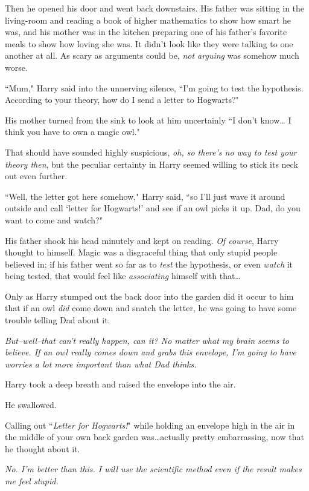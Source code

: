 Then he opened his door and went back downstairs. His father was sitting in the living-room and reading a book of higher mathematics to show how smart he was, and his mother was in the kitchen preparing one of his father's favorite meals to show how loving she was. It didn't look like they were talking to one another at all. As scary as arguments could be, \emph{not arguing} was somehow much worse.

``Mum," Harry said into the unnerving silence, ``I'm going to test the hypothesis. According to your theory, how do I send a letter to Hogwarts?"

His mother turned from the sink to look at him uncertainly ``I don't know{\ldots} I think you have to own a magic owl."

That should have sounded highly suspicious, \emph{oh, so there's no way to test your theory then}, but the peculiar certainty in Harry seemed willing to stick its neck out even further.

``Well, the letter got here somehow," Harry said, ``so I'll just wave it around outside and call `letter for Hogwarts!' and see if an owl picks it up. Dad, do you want to come and watch?"

His father shook his head minutely and kept on reading. \emph{Of course}, Harry thought to himself. Magic was a disgraceful thing that only stupid people believed in; if his father went so far as to \emph{test} the hypothesis, or even \emph{watch} it being tested, that would feel like \emph{associating} himself with that{\ldots}

Only as Harry stumped out the back door into the garden did it occur to him that if an owl \emph{did} come down and snatch the letter, he was going to have some trouble telling Dad about it.

\emph{But\---well\---that can't \emph{really} happen, can it? No matter what my brain seems to believe. If an owl really comes down and grabs this envelope, I'm going to have worries a lot more important than what Dad thinks.}

Harry took a deep breath and raised the envelope into the air.

He swallowed.

Calling out ``\emph{Letter for Hogwarts!}" while holding an envelope high in the air in the middle of your own back garden was{\ldots}actually pretty embarrassing, now that he thought about it.

\emph{No. I'm better than this. I will use the scientific method even if the result makes me feel stupid.}

